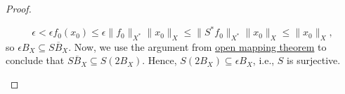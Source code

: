 \begin{proof}
\begin{enumerate}[(a)]
		      \[
			      \epsilon
			      < \epsilon f_0(x_0)
			      \leq \epsilon \lVert f_0 \rVert _{X^{\ast} } \lVert x_0 \rVert _X
			      \leq \lVert S^{\ast} f_0 \rVert _{X^{\ast} } \lVert x_0 \rVert _X
			      \leq \lVert x_0 \rVert _X,
		      \]
		      so \(\epsilon B_X \subseteq \overline{SB_X}\). Now, we use the argument from \hyperref[thm:open-mapping]{open mapping theorem} to conclude that \(\overline{SB_X} \subseteq S(2B_X)\). Hence, \(S(2B_X) \subseteq \epsilon B_X\), i.e., \(S\) is surjective.
	\end{enumerate}
\end{proof}
